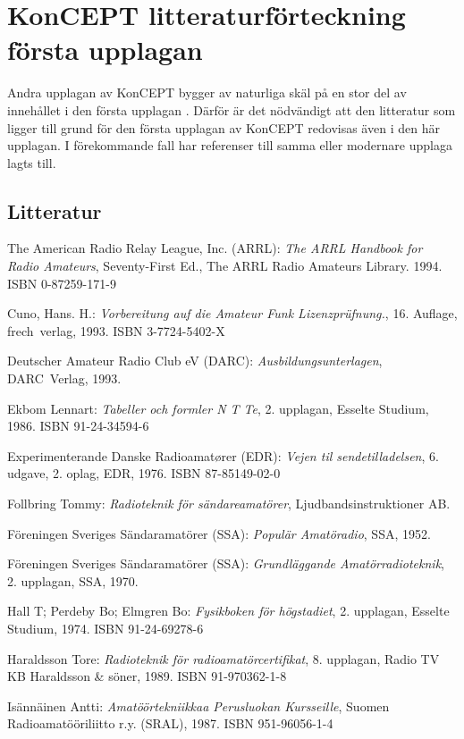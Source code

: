\chapter{KonCEPT litteraturförteckning första upplagan}
\label{konceptlitteratur}

\noindent
Andra upplagan av KonCEPT bygger av naturliga skäl på en stor del av innehållet
i den första upplagan \cite{KonCEPT1}.
Därför är det nödvändigt att den litteratur som ligger till grund för den första
upplagan av KonCEPT redovisas även i den här upplagan.
I förekommande fall har referenser till samma eller modernare upplaga lagts
till.

\section{Litteratur}

The American Radio Relay League, Inc. (ARRL):
\emph{The ARRL Handbook for Radio Amateurs}, Seventy-First Ed.,
The ARRL Radio Amateurs Library. 1994. ISBN 0-87259-171-9 \cite{ARRLHDB2015}

Cuno, Hans. H.: \emph{Vorbereitung auf die Amateur Funk Lizenzpr\"ufnung.},
16. Auflage, frech~verlag, 1993. ISBN 3-7724-5402-X

Deutscher Amateur Radio Club eV (DARC): \emph{Ausbildungsunterlagen},
DARC~Verlag, 1993. \cite{DARCaus}

Ekbom Lennart: \emph{Tabeller och formler N T Te}, 2. upplagan, Esselte Studium,
1986. ISBN 91-24-34594-6

Experimenterande Danske Radioamat\o rer (EDR):
\emph{Vejen til sendetilladelsen}, 6. udgave, 2. oplag, EDR, 1976.
ISBN 87-85149-02-0

Follbring Tommy: \emph{Radioteknik för sändareamatörer},
Ljudbandsinstruktioner AB.

Föreningen Sveriges Sändaramatörer (SSA): \emph{Populär Amatöradio}, SSA, 1952.

Föreningen Sveriges Sändaramatörer (SSA):
\emph{Grundläggande Amatörradioteknik}, 2. upplagan, SSA, 1970.

Hall T; Perdeby Bo; Elmgren Bo: \emph{Fysikboken för högstadiet}, 2. upplagan,
Esselte Studium, 1974. ISBN 91-24-69278-6

Haraldsson Tore: \emph{Radioteknik för radioamatörcertifikat}, 8. upplagan,
Radio TV KB Haraldsson \& söner, 1989. ISBN 91-970362-1-8

Isännäinen Antti: \emph{Amatöörtekniikkaa Perusluokan Kursseille}, Suomen
Radioamatööriliitto r.y. (SRAL), 1987. ISBN 951-96056-1-4

